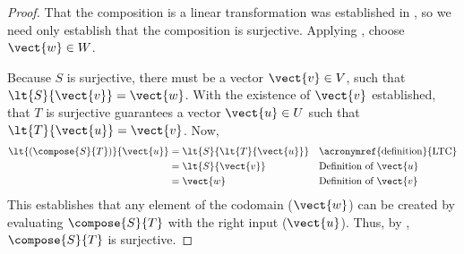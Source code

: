 %
\begin{proof}
That the composition is a linear transformation was established in , so we need only establish that the composition is surjective.  Applying , choose $\vect{w}\in W$.\par
%
Because $S$ is surjective, there must be a vector $\vect{v}\in V$, such that $\lt{S}{\vect{v}}=\vect{w}$.  With the existence of $\vect{v}$ established, that $T$ is surjective guarantees a vector $\vect{u}\in U$ such that $\lt{T}{\vect{u}}=\vect{v}$.  Now,
%
\begin{align*}
\lt{\left(\compose{S}{T}\right)}{\vect{u}}&=\lt{S}{\lt{T}{\vect{u}}}&&\text{\acronymref{definition}{LTC}}\\
&=\lt{S}{\vect{v}}&&\text{Definition of $\vect{u}$}\\
&=\vect{w}&&\text{Definition of $\vect{v}$}
\end{align*}
%
This establishes that any element of the codomain ($\vect{w}$) can be created by evaluating $\compose{S}{T}$ with the right input ($\vect{u}$).  Thus, by , $\compose{S}{T}$ is surjective.
%
\end{proof}
%
